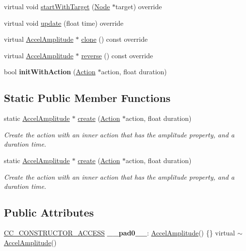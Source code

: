 \begin{DoxyCompactItemize}
virtual void \hyperlink{classAccelAmplitude_a8df55251b38588706be3d31c72db8737}{start\+With\+Target} (\hyperlink{classNode}{Node} $\ast$target) override
\item 
virtual void \hyperlink{classAccelAmplitude_a982a46aff6babd1ebc114be381e9e0e3}{update} (float time) override
\item 
virtual \hyperlink{classAccelAmplitude}{Accel\+Amplitude} $\ast$ \hyperlink{classAccelAmplitude_aea1295dd7e3961b2209d03915b323e1a}{clone} () const override
\item 
virtual \hyperlink{classAccelAmplitude}{Accel\+Amplitude} $\ast$ \hyperlink{classAccelAmplitude_aba6902dd2e533d43c0544f35d440c330}{reverse} () const override
\item 
\mbox{\label{classAccelAmplitude_a1ab884e63ec5270e75eb5995bcd68539}} 
bool {\bfseries init\+With\+Action} (\hyperlink{classAction}{Action} $\ast$action, float duration)
\end{DoxyCompactItemize}
\subsection*{Static Public Member Functions}
\begin{DoxyCompactItemize}
\item 
static \hyperlink{classAccelAmplitude}{Accel\+Amplitude} $\ast$ \hyperlink{classAccelAmplitude_a39dfe3b4b2ae24a4a64cda6be35ed217}{create} (\hyperlink{classAction}{Action} $\ast$action, float duration)
\begin{DoxyCompactList}\small\item\em Create the action with an inner action that has the amplitude property, and a duration time. \end{DoxyCompactList}\item 
static \hyperlink{classAccelAmplitude}{Accel\+Amplitude} $\ast$ \hyperlink{classAccelAmplitude_adc7d898bc8e0c3a88b60b2c40af5b403}{create} (\hyperlink{classAction}{Action} $\ast$action, float duration)
\begin{DoxyCompactList}\small\item\em Create the action with an inner action that has the amplitude property, and a duration time. \end{DoxyCompactList}\end{DoxyCompactItemize}
\subsection*{Public Attributes}
\begin{DoxyCompactItemize}
\item 
\mbox{\label{classAccelAmplitude_a587c16245b3136dd294745e08e643268}} 
\hyperlink{_2cocos2d_2cocos_2base_2ccConfig_8h_a25ef1314f97c35a2ed3d029b0ead6da0}{C\+C\+\_\+\+C\+O\+N\+S\+T\+R\+U\+C\+T\+O\+R\+\_\+\+A\+C\+C\+E\+SS} {\bfseries \+\_\+\+\_\+pad0\+\_\+\+\_\+}\+: \hyperlink{classAccelAmplitude}{Accel\+Amplitude}() \{\} virtual $\sim$\hyperlink{classAccelAmplitude}{Accel\+Amplitude}()
\end{DoxyCompactItemize}
